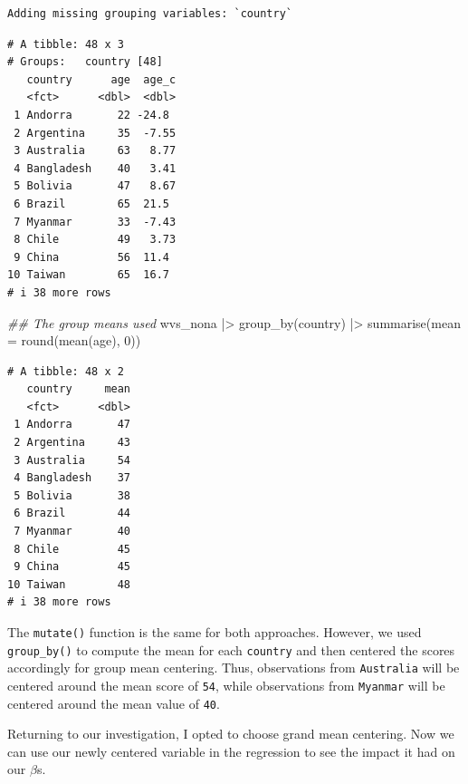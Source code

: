 \documentclass[
  letterpaper,
]{krantz}
\makeatletter
\newenvironment{Shaded}{\begin{snugshade}}{\end{snugshade}}
\newcommand{\AttributeTok}[1]{\textcolor[rgb]{0.40,0.45,0.13}{#1}}
\newcommand{\DecValTok}[1]{\textcolor[rgb]{0.68,0.00,0.00}{#1}}
\newcommand{\DocumentationTok}[1]{\textcolor[rgb]{0.37,0.37,0.37}{\textit{#1}}}
\newcommand{\FunctionTok}[1]{\textcolor[rgb]{0.28,0.35,0.67}{#1}}
\newcommand{\NormalTok}[1]{\textcolor[rgb]{0.00,0.23,0.31}{#1}}
\newcommand{\SpecialCharTok}[1]{\textcolor[rgb]{0.37,0.37,0.37}{#1}}
\newenvironment{kframe}{%
\medskip{}
\setlength{\fboxsep}{.8em}
 \def\at@end@of@kframe{}%
 \ifinner\ifhmode%
  \def\at@end@of@kframe{\end{minipage}}%
  \begin{minipage}{\columnwidth}%
 \fi\fi%
 \def\FrameCommand##1{\hskip\@totalleftmargin \hskip-\fboxsep
 \colorbox{shadecolor}{##1}\hskip-\fboxsep
     \hskip-\linewidth \hskip-\@totalleftmargin \hskip\columnwidth}%
 \MakeFramed {\advance\hsize-\width
   \@totalleftmargin\z@ \linewidth\hsize
   \@setminipage}}%
 {\par\unskip\endMakeFramed%
 \at@end@of@kframe}
\renewenvironment{Shaded}{\begin{kframe}}{\end{kframe}}
\makeatother
\begin{document}
\begin{verbatim}
Adding missing grouping variables: `country`
\end{verbatim}

\begin{verbatim}
# A tibble: 48 x 3
# Groups:   country [48]
   country      age  age_c
   <fct>      <dbl>  <dbl>
 1 Andorra       22 -24.8 
 2 Argentina     35  -7.55
 3 Australia     63   8.77
 4 Bangladesh    40   3.41
 5 Bolivia       47   8.67
 6 Brazil        65  21.5 
 7 Myanmar       33  -7.43
 8 Chile         49   3.73
 9 China         56  11.4 
10 Taiwan        65  16.7 
# i 38 more rows
\end{verbatim}

\begin{Shaded}
\begin{Highlighting}[]
\DocumentationTok{\#\# The group means used}
\NormalTok{wvs\_nona }\SpecialCharTok{|\textgreater{}}
  \FunctionTok{group\_by}\NormalTok{(country) }\SpecialCharTok{|\textgreater{}}
  \FunctionTok{summarise}\NormalTok{(}\AttributeTok{mean =} \FunctionTok{round}\NormalTok{(}\FunctionTok{mean}\NormalTok{(age), }\DecValTok{0}\NormalTok{))}
\end{Highlighting}
\end{Shaded}

\begin{verbatim}
# A tibble: 48 x 2
   country     mean
   <fct>      <dbl>
 1 Andorra       47
 2 Argentina     43
 3 Australia     54
 4 Bangladesh    37
 5 Bolivia       38
 6 Brazil        44
 7 Myanmar       40
 8 Chile         45
 9 China         45
10 Taiwan        48
# i 38 more rows
\end{verbatim}

The \texttt{mutate()} function is the same for both approaches. However,
we used \texttt{group\_by()} to compute the mean for each
\texttt{country} and then centered the scores accordingly for group mean
centering. Thus, observations from \texttt{Australia} will be centered
around the mean score of \texttt{54}, while observations from
\texttt{Myanmar} will be centered around the mean value of \texttt{40}.

Returning to our investigation, I opted to choose grand mean centering.
Now we can use our newly centered variable in the regression to see the
impact it had on our \(\beta\)s.
\end{document}
